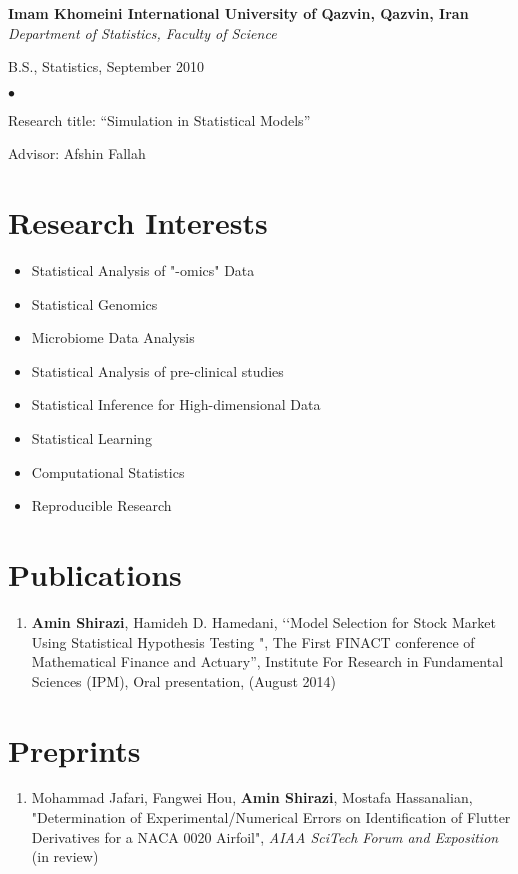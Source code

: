 \documentclass[margin,line]{res}
\newenvironment{list1}{
  \begin{list}{\ding{113}}{%
      \setlength{\itemsep}{0in}
      \setlength{\parsep}{0in} \setlength{\parskip}{0in}
      \setlength{\topsep}{0in} \setlength{\partopsep}{0in}
      \setlength{\leftmargin}{0.17in}}}{\end{list}}
\newenvironment{list2}{
  \begin{list}{$\bullet$}{%
      \setlength{\itemsep}{0in}
      \setlength{\parsep}{0in} \setlength{\parskip}{0in}
      \setlength{\topsep}{0in} \setlength{\partopsep}{0in}
      \setlength{\leftmargin}{0.2in}}}{\end{list}}
\begin{document}
\begin{resume}
{\bf Imam Khomeini International University of Qazvin, Qazvin, Iran} \\
{\em 	Department of Statistics, Faculty of Science}\\
\vspace*{-.1in}
\begin{list1}
	\item[]B.S., Statistics, September 2010
	\begin{list2}
		\vspace*{.05in}
		\item[] Research title:  ``Simulation in Statistical Models''
		\item[] Advisor: Afshin Fallah
	\end{list2}
\end{list1}
\section{\sc Research Interests}
\begin{itemize}
	\item Statistical Analysis of "-omics" Data
	\item Statistical Genomics
	\item Microbiome Data Analysis
	\item Statistical Analysis of pre-clinical studies
	\item Statistical Inference for High-dimensional Data
	\item Statistical Learning
	\item Computational Statistics
	\item Reproducible Research
\end{itemize}



\section{\sc Publications }
\begin{enumerate}
		\item \textbf{Amin Shirazi}, Hamideh D. Hamedani, ‘‘Model Selection for Stock Market Using Statistical Hypothesis Testing ", The First FINACT conference of Mathematical Finance and Actuary”, Institute For Research in Fundamental Sciences (IPM), Oral presentation, (August 2014) 
\end{enumerate}
\section{\sc Preprints}	
\begin{enumerate}
		\item  Mohammad Jafari, Fangwei Hou, \textbf{Amin Shirazi}, Mostafa Hassanalian, "Determination of Experimental/Numerical Errors on Identification of Flutter Derivatives for a NACA 0020 Airfoil", \textit{AIAA SciTech Forum and Exposition} (in review)  
\end{enumerate}	

\end{resume}
\end{document}
